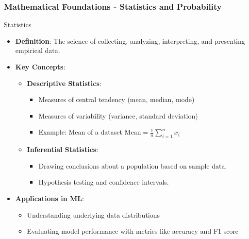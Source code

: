 \documentclass{beamer}
\begin{document}
\begin{frame}[fragile]
    \frametitle{Mathematical Foundations - Statistics and Probability}
    \begin{block}{Statistics}
        \begin{itemize}
            \item \textbf{Definition}: The science of collecting, analyzing, interpreting, and presenting empirical data.
            \item \textbf{Key Concepts}:
                \begin{itemize}
                    \item \textbf{Descriptive Statistics}:
                        \begin{itemize}
                            \item Measures of central tendency (mean, median, mode)
                            \item Measures of variability (variance, standard deviation)
                            \item Example: Mean of a dataset \( \text{Mean} = \frac{1}{n}\sum_{i=1}^{n} x_i \)
                        \end{itemize}
                        
                    \item \textbf{Inferential Statistics}:
                        \begin{itemize}
                            \item Drawing conclusions about a population based on sample data.
                            \item Hypothesis testing and confidence intervals.
                        \end{itemize}
                \end{itemize}
            \item \textbf{Applications in ML}:
                \begin{itemize}
                    \item Understanding underlying data distributions
                    \item Evaluating model performance with metrics like accuracy and F1 score
                \end{itemize}
        \end{itemize}
    \end{block}
    

\end{frame}
\end{document}
